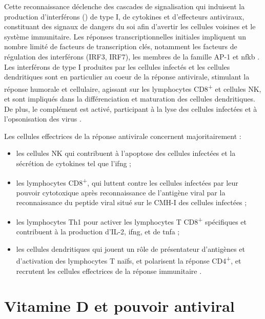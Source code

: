 \documentclass[
  a4paper,
  DIV=11,
  numbers=noendperiod,
  listof=totoc]{scrreprt}
\providecommand{\tightlist}{%
  \setlength{\itemsep}{0pt}\setlength{\parskip}{0pt}}\usepackage{longtable,booktabs,array}
\begin{document}
Cette reconnaissance déclenche des cascades de signalisation qui
induisent la production d'interférons () de type I, de
cytokines et d'effecteurs antiviraux, constituant des signaux de dangers
du soi afin d'avertir les cellules voisines et le système immunitaire.
Les réponses transcriptionnelles initiales impliquent un nombre limité
de facteurs de transcription clés, notamment les facteurs de régulation
des interférons (IRF3, IRF7), les membres de la famille AP-1 et
\ac{nfkb} \autocite{Bishop.2021,Ismailova.2022}. Les interférons de type
I produites par les cellules infectés et les cellules dendritiques sont
en particulier au coeur de la réponse antivirale, stimulant la réponse
humorale et cellulaire, agissant sur les lymphocytes
CD8\textsuperscript{+} et cellules \ac{NK}, et sont impliqués dans la
différenciation et maturation des cellules dendritiques. De plus, le
complément est activé, participant à la lyse des cellules infectées et à
l'opsonisation des virus \autocite{msd.complement.2024}.

Les cellules effectrices de la réponse antivirale concernent
majoritairement :

\begin{itemize}
\tightlist
\item
  les cellules \ac{NK} qui contribuent à l'apoptose des cellules
  infectées et la sécrétion de cytokines tel que l'\ac{ifng}
  \autocite{Narni-Mancinelli.2013} ;
\item
  les lymphocytes CD8\textsuperscript{+}, qui luttent contre les
  cellules infectées par leur pouvoir cytotoxique après reconnaissance
  de l'antigène viral par la reconnaissance du peptide viral situé sur
  le CMH-I des cellules infectées \autocite{Sigal.2016} ;
\item
  les lymphocytes Th1 pour activer les lymphocytes T
  CD8\textsuperscript{+} spécifiques et contribuent à la production
  d'IL-2, \ac{ifng}, et de \ac{tnfa} ;
\item
  les cellules dendritiques qui jouent un rôle de présentateur
  d'antigènes et d'activation des lymphocytes T naïfs, et polarisent la
  réponse CD4\textsuperscript{+}, et recrutent les cellules effectrices
  de la réponse immunitaire \autocite{Iwasaki.2012}.
\end{itemize}

\section{Vitamine D et pouvoir
antiviral}\label{vitamine-d-et-pouvoir-antiviral}
\end{document}
